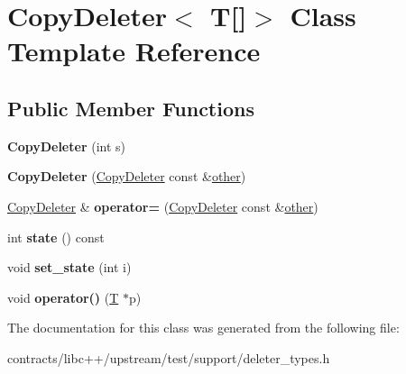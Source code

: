 \hypertarget{class_copy_deleter_3_01_t[]_4}{}\section{Copy\+Deleter$<$ T\mbox{[}\mbox{]}$>$ Class Template Reference}
\label{class_copy_deleter_3_01_t[]_4}
\subsection*{Public Member Functions}
\begin{DoxyCompactItemize}
\item 
\mbox{\label{class_copy_deleter_3_01_t[]_4_ac098b5de73d5ca004dc8578c05c72155}} 
{\bfseries Copy\+Deleter} (int s)
\item 
\mbox{\label{class_copy_deleter_3_01_t[]_4_a5dbcc9c9d25fb54869d250917d195c00}} 
{\bfseries Copy\+Deleter} (\mbox{\hyperlink{class_copy_deleter}{Copy\+Deleter}} const \&\mbox{\hyperlink{structother}{other}})
\item 
\mbox{\label{class_copy_deleter_3_01_t[]_4_a38986b6112fc028d0f5f59575d73f489}} 
\mbox{\hyperlink{class_copy_deleter}{Copy\+Deleter}} \& {\bfseries operator=} (\mbox{\hyperlink{class_copy_deleter}{Copy\+Deleter}} const \&\mbox{\hyperlink{structother}{other}})
\item 
\mbox{\label{class_copy_deleter_3_01_t[]_4_af3d5ea52deb1f7d04cfee37928cf147d}} 
int {\bfseries state} () const
\item 
\mbox{\label{class_copy_deleter_3_01_t[]_4_a0e3bf01d94fda1b71709bd7a81336ca6}} 
void {\bfseries set\+\_\+state} (int i)
\item 
\mbox{\label{class_copy_deleter_3_01_t[]_4_aa3d211a3b1eedb6a972633873d6436e3}} 
void {\bfseries operator()} (\mbox{\hyperlink{struct_t}{T}} $\ast$p)
\end{DoxyCompactItemize}


The documentation for this class was generated from the following file\+:\begin{DoxyCompactItemize}
\item 
contracts/libc++/upstream/test/support/deleter\+\_\+types.\+h\end{DoxyCompactItemize}

